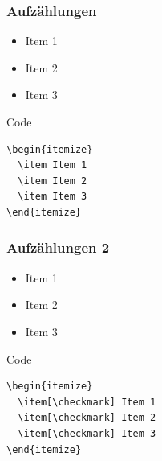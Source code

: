 \begin{frame}[fragile]
	\frametitle{Aufzählungen}

  \begin{example}
    \begin{itemize}
      \item Item 1
      \item Item 2
      \item Item 3
    \end{itemize}
  \end{example}

  \pause

  \begin{block}{Code}
    \begin{verbatim}
\begin{itemize}
  \item Item 1
  \item Item 2
  \item Item 3
\end{itemize}
    \end{verbatim}
  \end{block}
\end{frame}
\begin{frame}[fragile]
  \frametitle{Aufzählungen 2}

  \begin{example}
    \begin{itemize}
      \item[\checkmark] Item 1
      \item[\checkmark] Item 2
      \item[\checkmark] Item 3
    \end{itemize}
  \end{example}

  \pause

  \begin{block}{Code}
    \begin{verbatim}
\begin{itemize}
  \item[\checkmark] Item 1
  \item[\checkmark] Item 2
  \item[\checkmark] Item 3
\end{itemize}
    \end{verbatim}
  \end{block}
\end{frame}

